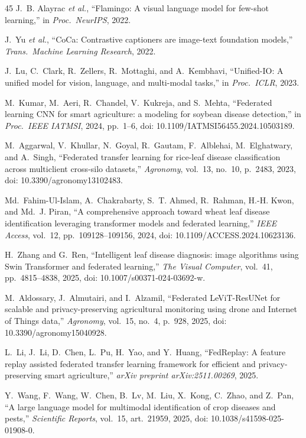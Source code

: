 \documentclass[conference]{IEEEtran}
\begin{document}
\begin{thebibliography}{45}
J.~B. Alayrac \emph{et al.},
``Flamingo: A visual language model for few-shot learning,''
in \emph{Proc.\ NeurIPS}, 2022.

J.~Yu \emph{et al.},
``CoCa: Contrastive captioners are image-text foundation models,''
\emph{Trans.\ Machine Learning Research}, 2022.

J.~Lu, C.~Clark, R.~Zellers, R.~Mottaghi, and A.~Kembhavi,
``Unified-IO: A unified model for vision, language, and multi-modal tasks,''
in \emph{Proc.\ ICLR}, 2023.

M.~Kumar, M.~Aeri, R.~Chandel, V.~Kukreja, and S.~Mehta,
``Federated learning {CNN} for smart agriculture: a modeling for soybean disease detection,''
in \emph{Proc.\ IEEE IATMSI}, 2024, pp.\ 1--6,
doi: 10.1109/IATMSI56455.2024.10503189.


M.~Aggarwal, V.~Khullar, N.~Goyal, R.~Gautam, F.~Alblehai, M.~Elghatwary, and A.~Singh,
``Federated transfer learning for rice-leaf disease classification across multiclient
cross-silo datasets,''
\emph{Agronomy}, vol.~13, no.~10, p.~2483, 2023,
doi: 10.3390/agronomy13102483.

Md.~Fahim-Ul-Islam, A.~Chakrabarty, S.~T. Ahmed, R.~Rahman, H.-H. Kwon, and Md.~J. Piran,
``A comprehensive approach toward wheat leaf disease identification leveraging
transformer models and federated learning,''
\emph{IEEE Access}, vol.~12, pp.\ 109128--109156, 2024,
doi: 10.1109/ACCESS.2024.10623136.

H.~Zhang and G.~Ren,
``Intelligent leaf disease diagnosis: image algorithms using {Swin Transformer}
and federated learning,''
\emph{The Visual Computer}, vol.~41, pp.\ 4815--4838, 2025,
doi: 10.1007/s00371-024-03692-w.

M.~Aldossary, J.~Almutairi, and I.~Alzamil,
``Federated {LeViT-ResUNet} for scalable and privacy-preserving agricultural monitoring
using drone and Internet of Things data,''
\emph{Agronomy}, vol.~15, no.~4, p.~928, 2025,
doi: 10.3390/agronomy15040928.

L.~Li, J.~Li, D.~Chen, L.~Pu, H.~Yao, and Y.~Huang,
``{FedReplay}: A feature replay assisted federated transfer learning framework
for efficient and privacy-preserving smart agriculture,''
\emph{arXiv preprint arXiv:2511.00269}, 2025.

Y.~Wang, F.~Wang, W.~Chen, B.~Lv, M.~Liu, X.~Kong, C.~Zhao, and Z.~Pan,
``A large language model for multimodal identification of crop diseases and pests,''
\emph{Scientific Reports}, vol.~15, art.\ 21959, 2025,
doi: 10.1038/s41598-025-01908-0.


\end{thebibliography}
\end{document}
